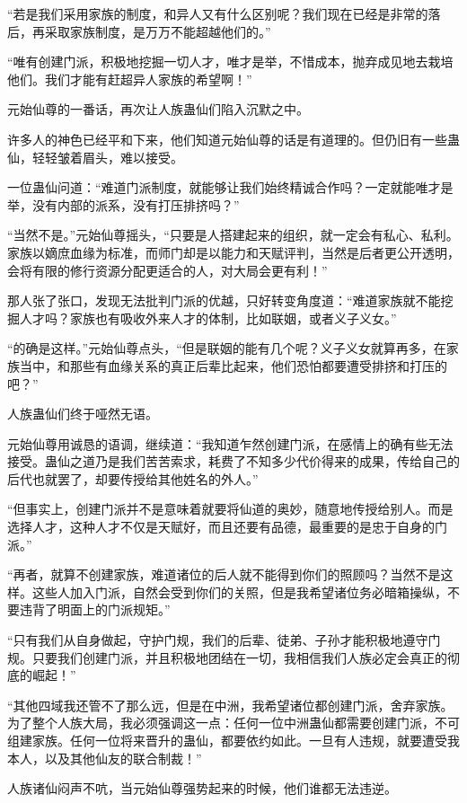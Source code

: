 \begin{this_body}
“若是我们采用家族的制度，和异人又有什么区别呢？我们现在已经是非常的落后，再采取家族制度，是万万不能超越他们的。”

“唯有创建门派，积极地挖掘一切人才，唯才是举，不惜成本，抛弃成见地去栽培他们。我们才能有赶超异人家族的希望啊！”

元始仙尊的一番话，再次让人族蛊仙们陷入沉默之中。

许多人的神色已经平和下来，他们知道元始仙尊的话是有道理的。但仍旧有一些蛊仙，轻轻皱着眉头，难以接受。

一位蛊仙问道：“难道门派制度，就能够让我们始终精诚合作吗？一定就能唯才是举，没有内部的派系，没有打压排挤吗？”

“当然不是。”元始仙尊摇头，“只要是人搭建起来的组织，就一定会有私心、私利。家族以嫡庶血缘为标准，而师门却是以能力和天赋评判，当然是后者更公开透明，会将有限的修行资源分配更适合的人，对大局会更有利！”

那人张了张口，发现无法批判门派的优越，只好转变角度道：“难道家族就不能挖掘人才吗？家族也有吸收外来人才的体制，比如联姻，或者义子义女。”

“的确是这样。”元始仙尊点头，“但是联姻的能有几个呢？义子义女就算再多，在家族当中，和那些有血缘关系的真正后辈比起来，他们恐怕都要遭受排挤和打压的吧？”

人族蛊仙们终于哑然无语。

元始仙尊用诚恳的语调，继续道：“我知道乍然创建门派，在感情上的确有些无法接受。蛊仙之道乃是我们苦苦索求，耗费了不知多少代价得来的成果，传给自己的后代也就罢了，却要传授给其他姓名的外人。”

“但事实上，创建门派并不是意味着就要将仙道的奥妙，随意地传授给别人。而是选择人才，这种人才不仅是天赋好，而且还要有品德，最重要的是忠于自身的门派。”

“再者，就算不创建家族，难道诸位的后人就不能得到你们的照顾吗？当然不是这样。这些人加入门派，自然会受到你们的关照，但是我希望诸位务必暗箱操纵，不要违背了明面上的门派规矩。”

“只有我们从自身做起，守护门规，我们的后辈、徒弟、子孙才能积极地遵守门规。只要我们创建门派，并且积极地团结在一切，我相信我们人族必定会真正的彻底的崛起！”

“其他四域我还管不了那么远，但是在中洲，我希望诸位都创建门派，舍弃家族。为了整个人族大局，我必须强调这一点：任何一位中洲蛊仙都需要创建门派，不可组建家族。任何一位将来晋升的蛊仙，都要依约如此。一旦有人违规，就要遭受我本人，以及其他仙友的联合制裁！”

人族诸仙闷声不吭，当元始仙尊强势起来的时候，他们谁都无法违逆。


\end{this_body}
